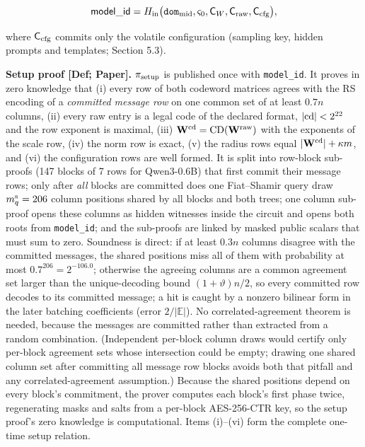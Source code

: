 \documentclass[10pt]{article}
\begin{document}
\[\mathsf{model\_id}=H_{\rm in}\big(\texttt{dom}_{\rm mid},\varsigma_0,\mathsf C_W,\mathsf C_{\rm raw},\mathsf C_{\rm cfg}\big),\]

where $\mathsf C_{\rm cfg}$ commits only the volatile configuration (sampling key, hidden prompts and templates; Section 5.3).

\textbf{Setup proof [Def; Paper].} $\pi_{\rm setup}$ is published once with \texttt{model\_\allowbreak{}id}. It proves in zero knowledge that (i) every row of both codeword matrices agrees with the RS encoding of a \emph{committed message row} on one common set of at least $0.7n$ columns, (ii) every raw entry is a legal code of the declared format, $\lvert{\rm cd}\rvert<2^{22}$ and the row exponent is maximal, (iii) $\mathbf W^{\rm cd}=\mathrm{CD}(\mathbf W^{\rm raw})$ with the exponents of the scale row, (iv) the norm row is exact, (v) the radius rows equal $\lvert\mathbf W^{\rm cd}\rvert+\kappa m$, and (vi) the configuration rows are well formed. It is split into row-block sub-proofs (147 blocks of 7 rows for Qwen3-0.6B) that first commit their message rows; only after \emph{all} blocks are committed does one Fiat--Shamir query draw $m^{\rm s}_q=206$ column positions shared by all blocks and both trees; one column sub-proof opens these columns as hidden witnesses inside the circuit and opens both roots from \texttt{model\_\allowbreak{}id}; and the sub-proofs are linked by masked public scalars that must sum to zero. Soundness is direct: if at least $0.3n$ columns disagree with the committed messages, the shared positions miss all of them with probability at most $0.7^{206}=2^{-106.0}$; otherwise the agreeing columns are a common agreement set larger than the unique-decoding bound $(1+\vartheta)n/2$, so every committed row decodes to its committed message; a hit is caught by a nonzero bilinear form in the later batching coefficients (error $2/\lvert\mathbb E\rvert$). No correlated-agreement theorem is needed, because the messages are committed rather than extracted from a random combination. (Independent per-block column draws would certify only per-block agreement sets whose intersection could be empty; drawing one shared column set after committing all message row blocks avoids both that pitfall and any correlated-agreement assumption.) Because the shared positions depend on every block's commitment, the prover computes each block's first phase twice, regenerating masks and salts from a per-block AES-256-CTR key, so the setup proof's zero knowledge is computational. Items (i)--(vi) form the complete one-time setup relation.
\end{document}
